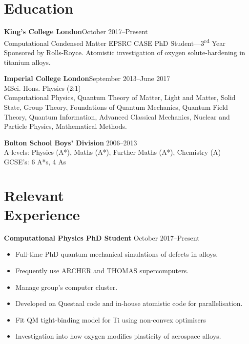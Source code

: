 \documentclass[margin]{res}
\begin{document}
 
\begin{resume} 
 

  \section{Education}
{\bf King's College London}\hfill October 2017--Present\\
Computational Condensed Matter EPSRC CASE PhD Student---3\textsuperscript{rd} Year\\
Sponsored by Rolls-Royce.
Atomistic investigation of oxygen solute-hardening in titanium alloys. 
  
{\bf Imperial College London}\hfill September 2013--June 2017\\
MSci. Hons. Physics (2:1)\\
Computational Physics, Quantum Theory of Matter, Light and Matter, Solid State, Group Theory, Foundations of Quantum Mechanics, Quantum Field Theory, Quantum Information, Advanced Classical Mechanics, Nuclear and Particle Physics, Mathematical Methods.

{\bf Bolton School Boys' Division} \hfill 2006--2013 \\
A-levels: Physics (A*), Maths (A*), Further Maths (A*), Chemistry (A)\\
GCSE's: 6 A*s, 4 As
 

\section{Relevant\\ Experience}

{\bf Computational Physics PhD Student }\hfill October 2017--Present\\
  \begin{itemize} \itemsep -2pt  %
    \item Full-time PhD  quantum mechanical simulations of defects in alloys. 
    \item Frequently use ARCHER and THOMAS supercomputers. 
    \item Manage group's computer cluster. 
    \item Developed on Questaal code and in-house atomistic code for parallelisation.
    \item Fit QM tight-binding model for Ti using non-convex optimisers
    \item Investigation into how oxygen modifies plasticity of aerospace alloys. 
  \end{itemize}


\end{resume}
\end{document}
